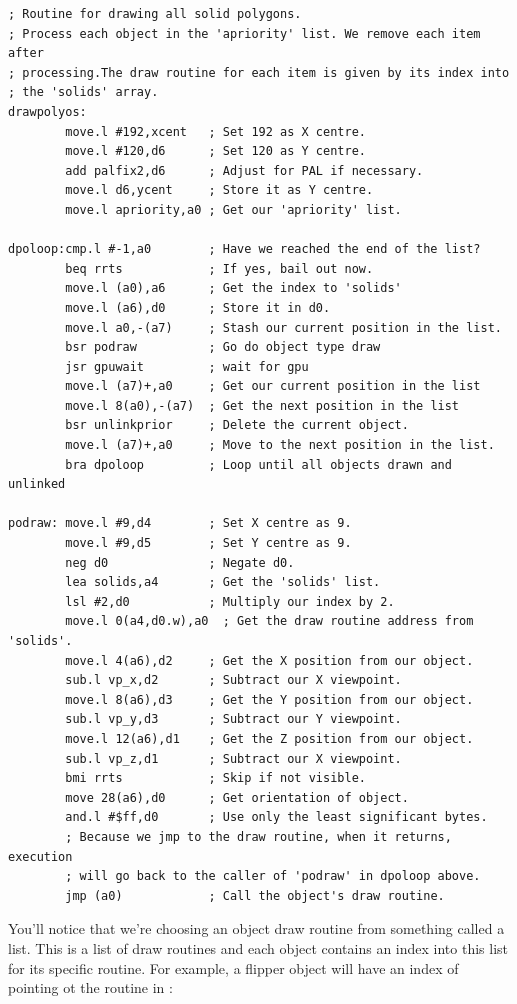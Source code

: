 \begin{lstlisting}
; Routine for drawing all solid polygons.
; Process each object in the 'apriority' list. We remove each item after
; processing.The draw routine for each item is given by its index into
; the 'solids' array.
drawpolyos:
        move.l #192,xcent   ; Set 192 as X centre.
        move.l #120,d6      ; Set 120 as Y centre.
        add palfix2,d6      ; Adjust for PAL if necessary.
        move.l d6,ycent     ; Store it as Y centre.
        move.l apriority,a0 ; Get our 'apriority' list.

dpoloop:cmp.l #-1,a0        ; Have we reached the end of the list?
        beq rrts            ; If yes, bail out now.
        move.l (a0),a6      ; Get the index to 'solids'
        move.l (a6),d0      ; Store it in d0.
        move.l a0,-(a7)     ; Stash our current position in the list.
        bsr podraw          ; Go do object type draw
        jsr gpuwait         ; wait for gpu
        move.l (a7)+,a0     ; Get our current position in the list
        move.l 8(a0),-(a7)  ; Get the next position in the list
        bsr unlinkprior     ; Delete the current object.
        move.l (a7)+,a0     ; Move to the next position in the list.
        bra dpoloop         ; Loop until all objects drawn and unlinked
 
podraw: move.l #9,d4        ; Set X centre as 9.
        move.l #9,d5        ; Set Y centre as 9.
        neg d0              ; Negate d0.
        lea solids,a4       ; Get the 'solids' list.
        lsl #2,d0           ; Multiply our index by 2.
        move.l 0(a4,d0.w),a0  ; Get the draw routine address from 'solids'.
        move.l 4(a6),d2     ; Get the X position from our object.
        sub.l vp_x,d2       ; Subtract our X viewpoint.
        move.l 8(a6),d3     ; Get the Y position from our object.
        sub.l vp_y,d3       ; Subtract our Y viewpoint.
        move.l 12(a6),d1    ; Get the Z position from our object.
        sub.l vp_z,d1       ; Subtract our X viewpoint.
        bmi rrts            ; Skip if not visible.
        move 28(a6),d0      ; Get orientation of object.
        and.l #$ff,d0       ; Use only the least significant bytes.
        ; Because we jmp to the draw routine, when it returns, execution
        ; will go back to the caller of 'podraw' in dpoloop above.
        jmp (a0)            ; Call the object's draw routine.
\end{lstlisting}

You'll notice that we're choosing an object draw routine from something
called a  list. This is a list of draw routines and each
object contains an index into this list for its specific routine. For example,
a flipper object will have an index of  pointing ot the 
routine in :

